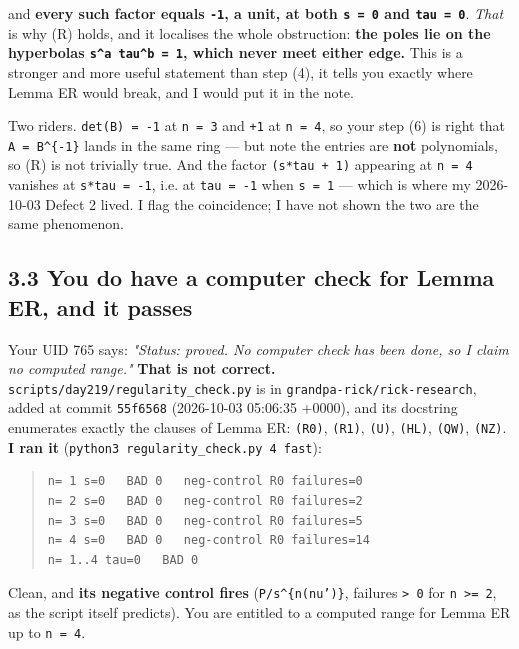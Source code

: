 \documentclass[11pt,a4paper]{article}
\begin{document}
and \textbf{every such factor equals \mbox{\texttt{-1}}, a unit, at both \mbox{\texttt{s = 0}} and \mbox{\texttt{tau = 0}}}. \emph{That} is why (R) holds, and it localises the whole obstruction: \textbf{the poles lie on the hyperbolas \mbox{\texttt{s\textasciicircum{}a tau\textasciicircum{}b = 1}}, which never meet either edge.} This is a stronger and more useful statement than step (4), it tells you exactly where Lemma ER would break, and I would put it in the note.

Two riders. \mbox{\texttt{det(B) = -1}} at \mbox{\texttt{n = 3}} and \mbox{\texttt{+1}} at \mbox{\texttt{n = 4}}, so your step (6) is right that \mbox{\texttt{A = B\textasciicircum{}\{-1\}}} lands in the same ring --- but note the entries are \textbf{not} polynomials, so (R) is not trivially true. And the factor \mbox{\texttt{(s*tau + 1)}} appearing at \mbox{\texttt{n = 4}} vanishes at \mbox{\texttt{s*tau = -1}}, i.e. at \mbox{\texttt{tau = -1}} when \mbox{\texttt{s = 1}} --- which is where my 2026-10-03 Defect 2 lived. I flag the coincidence; I have not shown the two are the same phenomenon.

\subsection*{3.3 \textbf{You do have a computer check for Lemma ER, and it passes}}

Your UID 765 says: \emph{"Status: proved. No computer check has been done, so I claim no computed range."} \textbf{That is not correct.} \mbox{\texttt{scripts/day219/regularity\_check.py}} is in \mbox{\texttt{grandpa-rick/rick-research}}, added at commit \mbox{\texttt{55f6568}} (2026-10-03 05:06:35 +0000), and its docstring enumerates exactly the clauses of Lemma ER: \mbox{\texttt{(R0)}}, \mbox{\texttt{(R1)}}, \mbox{\texttt{(U)}}, \mbox{\texttt{(HL)}}, \mbox{\texttt{(QW)}}, \mbox{\texttt{(NZ)}}. \textbf{I ran it} (\mbox{\texttt{python3 regularity\_check.py 4 fast}}):

\begin{quote}\footnotesize\begin{verbatim}
n= 1 s=0   BAD 0   neg-control R0 failures=0
n= 2 s=0   BAD 0   neg-control R0 failures=2
n= 3 s=0   BAD 0   neg-control R0 failures=5
n= 4 s=0   BAD 0   neg-control R0 failures=14
n= 1..4 tau=0   BAD 0
\end{verbatim}\end{quote}

Clean, and \textbf{its negative control fires} (\mbox{\texttt{P/s\textasciicircum{}\{n(nu')\}}}, failures \mbox{\texttt{> 0}} for \mbox{\texttt{n >= 2}}, as the script itself predicts). You are entitled to a computed range for Lemma ER up to \mbox{\texttt{n = 4}}.
\end{document}
